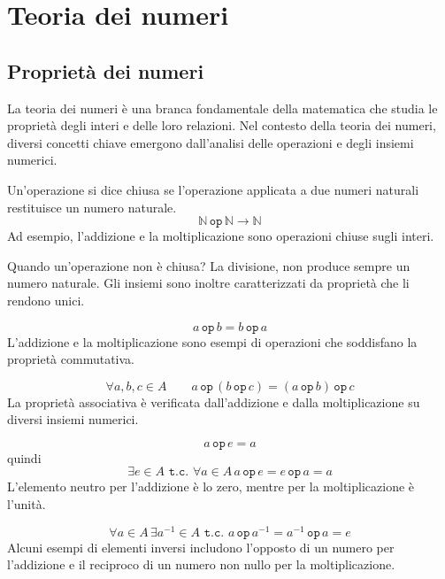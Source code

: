 \chapter{Teoria dei numeri}
\section{Proprietà dei numeri}

La teoria dei numeri è una branca fondamentale della matematica che studia le proprietà degli interi e delle loro relazioni. Nel contesto della teoria dei numeri, diversi concetti chiave emergono dall'analisi delle operazioni e degli insiemi numerici.

\begin{tcolorbox}[title={Operazioni chiuse}]
Un'operazione si dice chiusa se l'operazione applicata a due numeri naturali restituisce un numero naturale.
\[
  \mathbb{N} \, \texttt{op} \, \mathbb{N} \to \mathbb{N}  
\]
Ad esempio, l'addizione e la moltiplicazione sono operazioni chiuse sugli interi.
\end{tcolorbox}

Quando un'operazione non è chiusa? La divisione, non produce sempre un numero naturale. Gli insiemi sono inoltre caratterizzati da proprietà che li rendono unici.

\begin{tcolorbox}[title={Proprietà commutativa}]
  \[
    a \, \texttt{op} \, b = b \, \texttt{op} \, a
  \]
L'addizione e la moltiplicazione sono esempi di operazioni che soddisfano la proprietà commutativa.
\end{tcolorbox}

\begin{tcolorbox}[title={Proprietà associativa}]
  \[
    \forall a, b, c \in A \qquad a \, \texttt{op} \, (b \, \texttt{op} \, c) = (a \, \texttt{op} \, b) \, \texttt{op} \, c
  \]
La proprietà associativa è verificata dall'addizione e dalla moltiplicazione su diversi insiemi numerici.
\end{tcolorbox}

\begin{tcolorbox}[title={Elemento neutro}]
  \[
    a \, \texttt{op} \, e = a
  \]
  quindi 
  \[
    \exists e \in A \texttt{ t.c. }\forall a \in A \, a \, \texttt{op} \, e = e \, \texttt{op} \, a = a
  \]
L'elemento neutro per l'addizione è lo zero, mentre per la moltiplicazione è l'unità.
\end{tcolorbox}

\begin{tcolorbox}[title={Elemento inverso}]
  \[
    \forall a \in A \, \exists a^{-1} \in A \texttt{ t.c. } a \, \texttt{op} \, a^{-1} = a^{-1} \, \texttt{op} \, a = e
  \]
Alcuni esempi di elementi inversi includono l'opposto di un numero per l'addizione e il reciproco di un numero non nullo per la moltiplicazione.
\end{tcolorbox}

